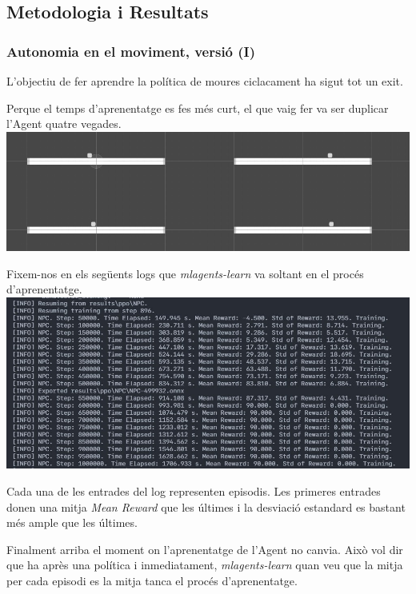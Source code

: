 \documentclass{article}
\begin{document}
   \newpage
    
    \subsection{Metodologia i Resultats}
    
    \subsubsection{Autonomia en el moviment, versió (I)}
    L'objectiu de fer aprendre la política de moures ciclacament ha sigut tot un exit. 
    
    Perque el temps d'aprenentatge es fes més curt, el que vaig fer va ser duplicar l'Agent quatre vegades. \\
    
    \includegraphics[width=\textwidth]{images/v1/autonomia_v1.jpeg}
    
    Fixem-nos en els següents logs que \textit{mlagents-learn} va soltant en el procés d'aprenentatge. \\
    
    \includegraphics[width=\textwidth]{images/v1/log_v1.jpeg}
    
    Cada una de les entrades del log representen episodis. Les primeres entrades donen una mitja \textit{Mean Reward} que les últimes i la desviació estandard es bastant més ample que les últimes.
    
    Finalment arriba el moment on l'aprenentatge de l'Agent no canvia. Això vol dir que ha après una política i inmediatament, \textit{mlagents-learn} quan veu que la mitja per cada episodi es la mitja tanca el procés d'aprenentatge.
    
\end{document}
